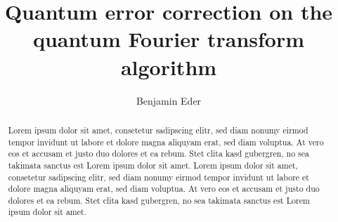 \documentclass[num-refs]{wiley-networks}
\title{Quantum error correction on the quantum Fourier transform algorithm}
\author[1\authfn{1}]{Benjamin Eder}
\begin{document}
    \maketitle

    \begin{abstract}
        Lorem ipsum dolor sit amet, consetetur sadipscing elitr, sed diam nonumy eirmod tempor invidunt ut labore et dolore magna aliquyam erat, sed diam voluptua. At vero eos et accusam et justo duo dolores et ea rebum. Stet clita kasd gubergren, no sea takimata sanctus est Lorem ipsum dolor sit amet. Lorem ipsum dolor sit amet, consetetur sadipscing elitr, sed diam nonumy eirmod tempor invidunt ut labore et dolore magna aliquyam erat, sed diam voluptua. At vero eos et accusam et justo duo dolores et ea rebum. Stet clita kasd gubergren, no sea takimata sanctus est Lorem ipsum dolor sit amet.
    \end{abstract}


    \begingroup
    \hypersetup{linkcolor=black}
    \tableofcontents
    \endgroup

    \setlength{\parskip}{0.2cm}%

    
    
    
    
    
    

    \newpage

    

    \newpage

    \appendix
    
\end{document}
